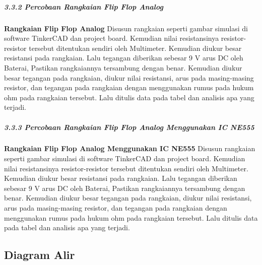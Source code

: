 \documentclass[12pt,a4paper]{article}
\begin{document}
	\subparagraph{3.3.2 Percobaan Rangkaian Flip Flop Analog}
	\subparagraph{ }
\textbf{Rangkaian Flip Flop Analog} Disusun rangkaian seperti gambar simulasi di software TinkerCAD dan project board. Kemudian nilai resistansinya resistor-resistor tersebut ditentukan sendiri oleh Multimeter. Kemudian diukur besar resistansi pada rangkaian. Lalu tegangan diberikan sebesar 9 V arus DC oleh Baterai, Pastikan rangkaiannya tersambung dengan benar. Kemudian diukur besar tegangan pada rangkaian, diukur nilai resistansi, arus pada masing-masing resistor, dan tegangan pada rangkaian dengan menggunakan rumus pada hukum ohm  pada rangkaian tersebut. Lalu ditulis data pada tabel dan analisis apa yang terjadi.

	\subparagraph{3.3.3 Percobaan Rangkaian Flip Flop Analog Menggunakan IC NE555}
	\subparagraph{ }
\textbf{Rangkaian Flip Flop Analog Menggunakan IC NE555} Disusun rangkaian seperti gambar simulasi di software TinkerCAD dan project board. Kemudian nilai resistansinya resistor-resistor tersebut ditentukan sendiri oleh Multimeter. Kemudian diukur besar resistansi pada rangkaian. Lalu tegangan diberikan sebesar 9 V arus DC oleh Baterai, Pastikan rangkaiannya tersambung dengan benar. Kemudian diukur besar tegangan pada rangkaian, diukur nilai resistansi, arus pada masing-masing resistor, dan tegangan pada rangkaian dengan menggunakan rumus pada hukum ohm  pada rangkaian tersebut. Lalu ditulis data pada tabel dan analisis apa yang terjadi.

\subsection{Diagram Alir}
\end{document}
